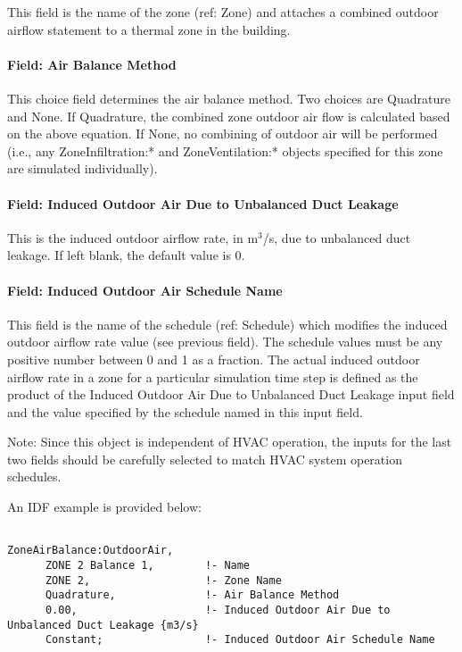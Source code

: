 This field is the name of the zone (ref: Zone) and attaches a combined outdoor airflow statement to a thermal zone in the building.

\paragraph{Field: Air Balance Method}\label{field-air-balance-method}

This choice field determines the air balance method. Two choices are Quadrature and None. If Quadrature, the combined zone outdoor air flow is calculated based on the above equation. If None, no combining of outdoor air will be performed (i.e., any ZoneInfiltration:* and ZoneVentilation:* objects specified for this zone are simulated individually).

\paragraph{Field: Induced Outdoor Air Due to Unbalanced Duct Leakage}\label{field-induced-outdoor-air-due-to-unbalanced-duct-leakage}

This is the induced outdoor airflow rate, in m\(^{3}\)/s, due to unbalanced duct leakage. If left blank, the default value is 0.

\paragraph{Field: Induced Outdoor Air Schedule Name}\label{field-induced-outdoor-air-schedule-name}

This field is the name of the schedule (ref: Schedule) which modifies the induced outdoor airflow rate value (see previous field). The schedule values must be any positive number between 0 and 1 as a fraction. The actual induced outdoor airflow rate in a zone for a particular simulation time step is defined as the product of the Induced Outdoor Air Due to Unbalanced Duct Leakage input field and the value specified by the schedule named in this input field.

Note: Since this object is independent of HVAC operation, the inputs for the last two fields should be carefully selected to match HVAC system operation schedules.

An IDF example is provided below:

\begin{lstlisting}

ZoneAirBalance:OutdoorAir,
      ZONE 2 Balance 1,        !- Name
      ZONE 2,                  !- Zone Name
      Quadrature,              !- Air Balance Method
      0.00,                    !- Induced Outdoor Air Due to Unbalanced Duct Leakage {m3/s}
      Constant;                !- Induced Outdoor Air Schedule Name
\end{lstlisting}

